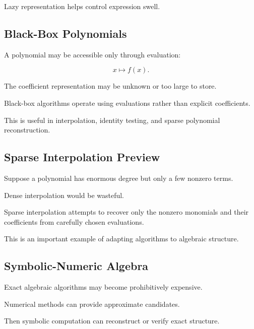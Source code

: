 Lazy representation helps control expression swell.

\subsection{Black-Box Polynomials}
\label{subsec:black-box-polynomials}

A polynomial may be accessible only through evaluation:

\[
\boxed{
x
\mapsto
f(x).
}
\]

The coefficient representation may be unknown or too large to store.

Black-box algorithms operate using evaluations rather than explicit
coefficients.

This is useful in interpolation, identity testing, and sparse polynomial
reconstruction.

\subsection{Sparse Interpolation Preview}
\label{subsec:sparse-interpolation-preview}

Suppose a polynomial has enormous degree but only a few nonzero terms.

Dense interpolation would be wasteful.

Sparse interpolation attempts to recover only the nonzero monomials and
their coefficients from carefully chosen evaluations.

This is an important example of adapting algorithms to algebraic
structure.

\subsection{Symbolic-Numeric Algebra}
\label{subsec:symbolic-numeric-algebra}

Exact algebraic algorithms may become prohibitively expensive.

Numerical methods can provide approximate candidates.

Then symbolic computation can reconstruct or verify exact structure.

